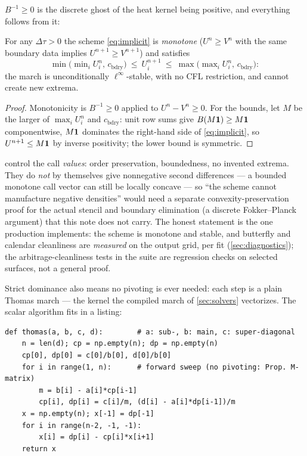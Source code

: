 \documentclass[11pt]{article}
\begin{document}
$B^{-1}\ge0$ is the discrete ghost of the heat kernel being positive, and
everything follows from it:

\begin{corollary}
\label{cor:dmp}
For any $\Delta\tau>0$ the scheme \eqref{eq:implicit} is \emph{monotone}
($U^{n}\ge V^{n}$ with the same boundary data implies $U^{n+1}\ge V^{n+1}$)
and satisfies
\[
\min\big(\min\nolimits_iU^{n}_i,\,c_{\mathrm{bdry}}\big)\ \le\ U^{n+1}_i\ \le\
\max\big(\max\nolimits_iU^{n}_i,\,c_{\mathrm{bdry}}\big):
\]
the march is unconditionally
$\ell^{\infty}$-stable, with no CFL restriction, and cannot create new
extrema.
\end{corollary}

\begin{proof}
Monotonicity is $B^{-1}\ge0$ applied to $U^{n}-V^{n}\ge0$.  For the bounds,
let $M$ be the larger of $\max_iU^{n}_i$ and $c_{\mathrm{bdry}}$: unit row
sums give $B(M\mathbf{1})\ge M\mathbf{1}$ componentwise, $M\mathbf{1}$ dominates the right-hand
side of \eqref{eq:implicit}, so $U^{n+1}\le M\mathbf{1}$ by inverse positivity; the
lower bound is symmetric.
\end{proof}

\begin{remark}[What the $M$-matrix argument does and does not prove]
\label{rem:mmscope}
 control the call \emph{values}: order
preservation, boundedness, no invented extrema.  They do \emph{not} by
themselves give nonnegative second differences --- a bounded monotone call
vector can still be locally concave --- so ``the scheme cannot manufacture
negative densities'' would need a separate convexity-preservation proof for
the actual stencil and boundary elimination (a discrete Fokker--Planck
argument) that this note does not carry.  The honest statement is the one
production implements: the scheme is monotone and stable, and butterfly and
calendar cleanliness are \emph{measured} on the output grid, per fit
(\cref{sec:diagnostics}); the arbitrage-cleanliness tests in the suite are
regression checks on selected surfaces, not a general proof.
\end{remark}

Strict dominance also means no pivoting is ever needed: each step is a
plain Thomas march --- the kernel the compiled march of
\cref{sec:solvers} vectorizes.  The scalar algorithm fits in a listing:

\begin{lstlisting}[caption={The no-pivot tridiagonal (Thomas) solve for one
implicit step \eqref{eq:implicit} --- the scalar algorithm that
\texttt{models/localvol/affine\_march.py} vectorizes; matches a dense solve
to $10^{-10}$.},label={lst:thomas}]
def thomas(a, b, c, d):        # a: sub-, b: main, c: super-diagonal
    n = len(d); cp = np.empty(n); dp = np.empty(n)
    cp[0], dp[0] = c[0]/b[0], d[0]/b[0]
    for i in range(1, n):      # forward sweep (no pivoting: Prop. M-matrix)
        m = b[i] - a[i]*cp[i-1]
        cp[i], dp[i] = c[i]/m, (d[i] - a[i]*dp[i-1])/m
    x = np.empty(n); x[-1] = dp[-1]
    for i in range(n-2, -1, -1):
        x[i] = dp[i] - cp[i]*x[i+1]
    return x
\end{lstlisting}
\end{document}
